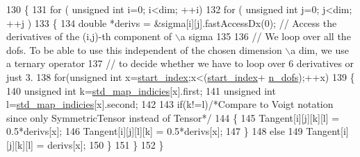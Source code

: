 \begin{DoxyCode}
130     \{
131         \textcolor{keywordflow}{for} ( \textcolor{keywordtype}{unsigned} \textcolor{keywordtype}{int} i=0; i<dim; ++i)
132             \textcolor{keywordflow}{for} ( \textcolor{keywordtype}{unsigned} \textcolor{keywordtype}{int} j=0; j<dim; ++j )
133             \{
134                 \textcolor{keywordtype}{double} *derivs = &sigma[i][j].fastAccessDx(0); \textcolor{comment}{// Access the derivatives of the (i,j)-th
       component of \(\backslash\)a sigma}
135 
136                 \textcolor{comment}{// We loop over all the dofs. To be able to use this independent of the chosen dimension \(\backslash\)a
       dim, we use a ternary operator}
137                 \textcolor{comment}{// to decide whether we have to loop over 6 derivatives or just 3.}
138                 \textcolor{keywordflow}{for}(\textcolor{keywordtype}{unsigned} \textcolor{keywordtype}{int} x=\hyperlink{classSacado__Wrapper_1_1SymTensor_afe921e6044e4110fcfc848c52844d650}{start\_index};x<(\hyperlink{classSacado__Wrapper_1_1SymTensor_afe921e6044e4110fcfc848c52844d650}{start\_index}+
      \hyperlink{classSacado__Wrapper_1_1SymTensor_a733bc4b029ff8d067b48e7ce3ee7606b}{n\_dofs});++x)
139                 \{
140                     \textcolor{keywordtype}{unsigned} \textcolor{keywordtype}{int} k=\hyperlink{classSacado__Wrapper_1_1SymTensor_ae3b1c56cde3fc5c7805b618ef3d9de75}{std\_map\_indicies}[x].first;
141                     \textcolor{keywordtype}{unsigned} \textcolor{keywordtype}{int} l=\hyperlink{classSacado__Wrapper_1_1SymTensor_ae3b1c56cde3fc5c7805b618ef3d9de75}{std\_map\_indicies}[x].second;
142 
143                     \textcolor{keywordflow}{if}(k!=l)\textcolor{comment}{/*Compare to Voigt notation since only SymmetricTensor instead of Tensor*/}
144                     \{
145                         Tangent[i][j][k][l] = 0.5*derivs[x];
146                         Tangent[i][j][l][k] = 0.5*derivs[x];
147                     \}
148                     \textcolor{keywordflow}{else}
149                         Tangent[i][j][k][l] = derivs[x];
150                 \}
151             \}
152     \}
\end{DoxyCode}
\mbox{\label{classSacado__Wrapper_1_1SymTensor_ac0ab9caa8c54102e24c4d007f820873b}} 
